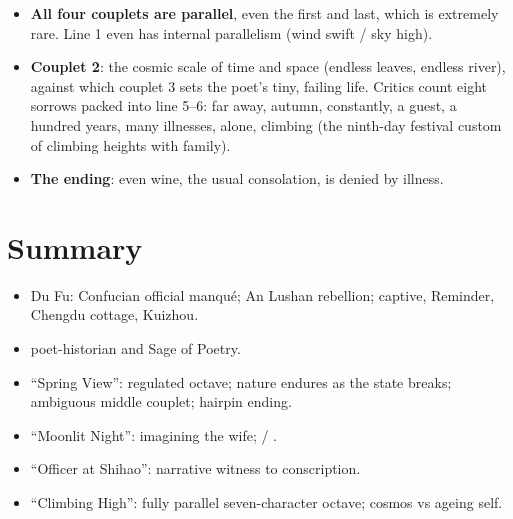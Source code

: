 \begin{itemize}
  \item \textbf{All four couplets are parallel}, even the first and last, which is
        extremely rare. Line 1 even has internal parallelism (wind swift / sky high).
  \item \textbf{Couplet 2}: the cosmic scale of time and space (endless leaves, endless
        river), against which couplet 3 sets the poet's tiny, failing life. Critics count
        eight sorrows packed into line 5--6: far away, autumn, constantly, a guest, a
        hundred years, many illnesses, alone, climbing (the ninth-day festival custom of
        climbing heights with family).
  \item \textbf{The ending}: even wine, the usual consolation, is denied by illness.
\end{itemize}

\section*{Summary}
\begin{itemize}
  \item Du Fu: Confucian official manqué; An Lushan rebellion; captive, Reminder, Chengdu
        cottage, Kuizhou.
  \item {} poet-historian and  Sage of Poetry.
  \item ``Spring View'': regulated octave; nature endures as the state breaks; ambiguous
        middle couplet; hairpin ending.
  \item ``Moonlit Night'': imagining the wife;  / .
  \item ``Officer at Shihao'': narrative witness to conscription.
  \item ``Climbing High'': fully parallel seven-character octave; cosmos vs ageing self.
\end{itemize}
